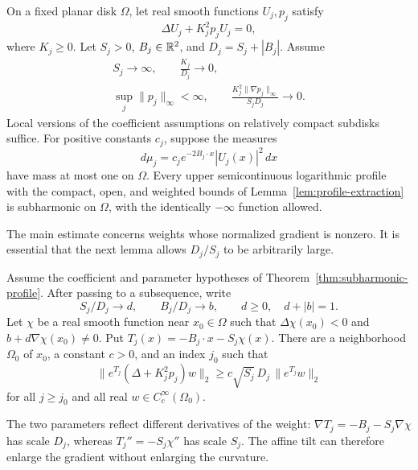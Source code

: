\begin{theorem}
\label{thm:subharmonic-profile}
On a fixed planar disk $\Omega$, let real smooth functions $U_j,p_j$
satisfy
\[
 \Delta U_j+K_j^2p_jU_j=0,
\]
where $K_j\ge0$.  Let $S_j>0$, $B_j\in\mathbb R^2$, and
$D_j=S_j+|B_j|$.  Assume
\begin{equation}\label{eq:profile-hypotheses}
 \begin{gathered}
 S_j\longrightarrow\infty,\qquad
 \frac{K_j}{D_j}\longrightarrow0,\\
 \sup_j\|p_j\|_\infty<\infty,\qquad
 \frac{K_j^2\|\nabla p_j\|_\infty}{S_jD_j}\longrightarrow0.
 \end{gathered}
\end{equation}
Local versions of the coefficient assumptions on relatively compact
subdisks suffice.  For positive constants $c_j$, suppose the measures
\[
 d\mu_j=c_j e^{-2B_j\cdot x}|U_j(x)|^2\,dx
\]
have mass at most one on $\Omega$.  Every upper semicontinuous
logarithmic profile with the compact, open, and weighted bounds of
Lemma~\ref{lem:profile-extraction} is subharmonic on $\Omega$,
with the identically $-\infty$ function allowed.
\end{theorem}

The main estimate concerns weights whose normalized gradient is
nonzero.  It is essential that the next lemma allows $D_j/S_j$ to
be arbitrarily large.

\begin{lemma}\label{lem:carleman}
Assume the coefficient and parameter hypotheses of
Theorem~\ref{thm:subharmonic-profile}.  After passing to a subsequence,
write
\[
 S_j/D_j\to d,\qquad B_j/D_j\to b,
 \qquad d\ge0,\quad d+|b|=1.
\]
Let $\chi$ be a real smooth function near $x_0\in\Omega$ such that
$\Delta\chi(x_0)<0$ and $b+d\nabla\chi(x_0)\ne0$.  Put
$T_j(x)=-B_j\cdot x-S_j\chi(x)$.  There are a neighborhood
$\Omega_0$ of $x_0$, a constant $c>0$, and an index $j_0$ such that
\begin{equation}\label{eq:carleman}
 \|e^{T_j}(\Delta+K_j^2p_j)w\|_2
 \ge c\sqrt{S_j}\,D_j\,\|e^{T_j}w\|_2
\end{equation}
for all $j\ge j_0$ and all real $w\in C_c^\infty(\Omega_0)$.
\end{lemma}

The two parameters reflect different derivatives of the weight:
$\nabla T_j=-B_j-S_j\nabla\chi$ has scale $D_j$, whereas
$T_j''=-S_j\chi''$ has scale $S_j$.  The affine tilt can therefore
enlarge the gradient without enlarging the curvature.

